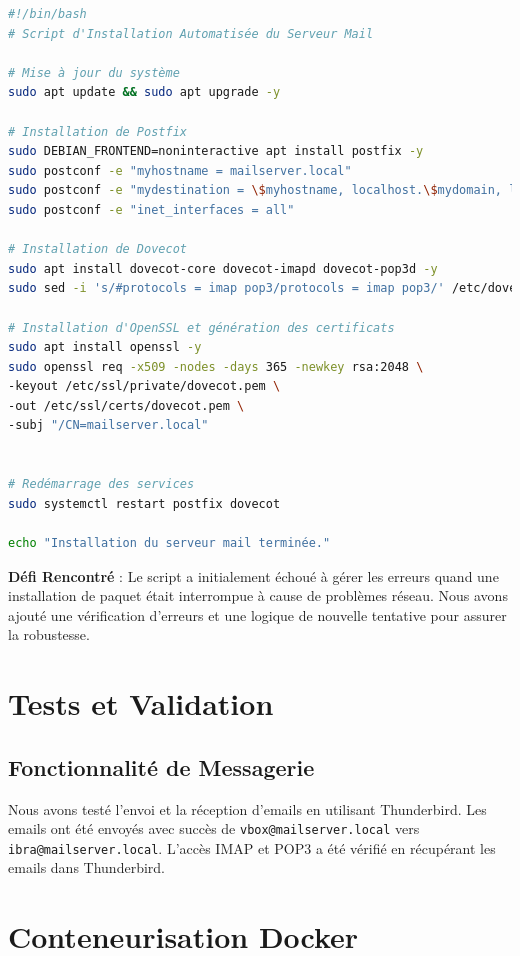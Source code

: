 \documentclass[a4paper,12pt]{article}
\begin{document}
\begin{lstlisting}[language=bash]
#!/bin/bash
# Script d'Installation Automatisée du Serveur Mail

# Mise à jour du système
sudo apt update && sudo apt upgrade -y

# Installation de Postfix
sudo DEBIAN_FRONTEND=noninteractive apt install postfix -y
sudo postconf -e "myhostname = mailserver.local"
sudo postconf -e "mydestination = \$myhostname, localhost.\$mydomain, localhost"
sudo postconf -e "inet_interfaces = all"

# Installation de Dovecot
sudo apt install dovecot-core dovecot-imapd dovecot-pop3d -y
sudo sed -i 's/#protocols = imap pop3/protocols = imap pop3/' /etc/dovecot/dovecot.conf

# Installation d'OpenSSL et génération des certificats
sudo apt install openssl -y
sudo openssl req -x509 -nodes -days 365 -newkey rsa:2048 \
-keyout /etc/ssl/private/dovecot.pem \
-out /etc/ssl/certs/dovecot.pem \
-subj "/CN=mailserver.local"


# Redémarrage des services
sudo systemctl restart postfix dovecot 

echo "Installation du serveur mail terminée."
\end{lstlisting}

\textbf{Défi Rencontré} : Le script a initialement échoué à gérer les erreurs quand une installation de paquet était interrompue à cause de problèmes réseau. Nous avons ajouté une vérification d'erreurs et une logique de nouvelle tentative pour assurer la robustesse.

\section{Tests et Validation}

\subsection{Fonctionnalité de Messagerie}
Nous avons testé l'envoi et la réception d'emails en utilisant Thunderbird. Les emails ont été envoyés avec succès de \texttt{vbox@mailserver.local} vers \texttt{ibra@mailserver.local}. L'accès IMAP et POP3 a été vérifié en récupérant les emails dans Thunderbird.


\section{Conteneurisation Docker}
\end{document}
